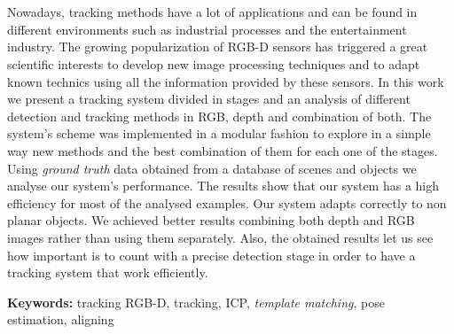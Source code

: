 \chapter*{\runtitle}


\noindent Nowadays, tracking methods have a lot of applications and can be found in different environments such as industrial processes and the entertainment industry. The growing popularization of RGB-D sensors has triggered a great scientific interests to develop new image processing techniques and to adapt known technics using all the information provided by these sensors. In this work we present a tracking system divided in stages and an analysis of different detection and tracking methods in RGB, depth and combination of both. The system's scheme was implemented in a modular fashion to explore in a simple way new methods and the best combination of them for each one of the stages. Using \textit{ground truth} data obtained from a database of scenes and objects we analyse our system's performance. The results show that our system has a high efficiency for most of the analysed examples. Our system adapts correctly to non planar objects. We achieved better results combining both depth and RGB images rather than using them separately. Also, the obtained results let us see how important is to count with a precise detection stage in order to have a tracking system that work efficiently.


\bigskip

\noindent\textbf{Keywords:} tracking RGB-D, tracking, ICP, \textit{template matching}, pose \\estimation, aligning



